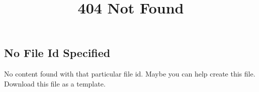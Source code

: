 \documentclass[10pt,a4paper]{report}
\title{404 Not Found}
\theoremstyle{thm}
\begin{document}
\subsection*{No File Id Specified}
No content found with that particular file id. Maybe you can help create this file. Download this file as a template.
\end{document}
